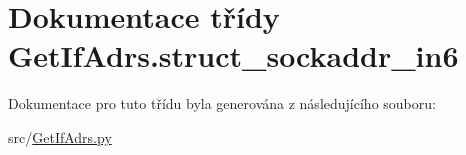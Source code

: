 \hypertarget{classGetIfAdrs_1_1struct__sockaddr__in6}{\section{Dokumentace třídy Get\-If\-Adrs.\-struct\-\_\-sockaddr\-\_\-in6}
\label{d0/df7/classGetIfAdrs_1_1struct__sockaddr__in6}
}


Dokumentace pro tuto třídu byla generována z následujícího souboru\-:\begin{DoxyCompactItemize}
\item 
src/\hyperlink{GetIfAdrs_8py}{Get\-If\-Adrs.\-py}\end{DoxyCompactItemize}

